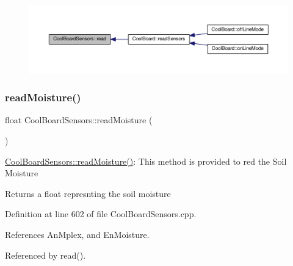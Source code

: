 \nopagebreak
\begin{figure}[H]
\begin{center}
\leavevmode
\includegraphics[width=350pt]{classCoolBoardSensors_a91badb2539d91fda8679f2a597874c48_icgraph}
\end{center}
\end{figure}
\mbox{\label{classCoolBoardSensors_a8761bff50373c485f4465c8db47d0633}} 
\subsubsection{\texorpdfstring{read\+Moisture()}{readMoisture()}}
{\footnotesize\ttfamily float Cool\+Board\+Sensors\+::read\+Moisture (\begin{DoxyParamCaption}{ }\end{DoxyParamCaption})}

\hyperlink{classCoolBoardSensors_a8761bff50373c485f4465c8db47d0633}{Cool\+Board\+Sensors\+::read\+Moisture()}\+: This method is provided to red the Soil Moisture

\begin{DoxyReturn}{Returns}
a float represnting the soil moisture 
\end{DoxyReturn}


Definition at line 602 of file Cool\+Board\+Sensors.\+cpp.



References An\+Mplex, and En\+Moisture.



Referenced by read().



